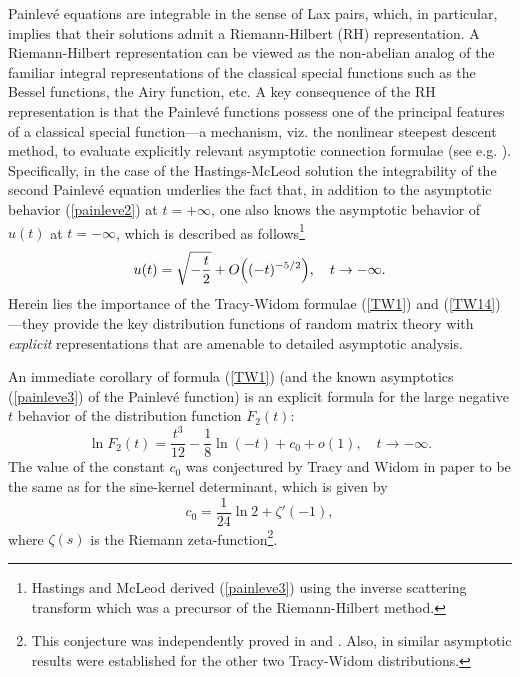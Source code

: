 \documentclass[11pt,letterpaper,reqno]{amsart}
\theoremstyle{definition}
\theoremstyle{remark}
\numberwithin{equation}{section}
\begin{document}
Painlev\'e equations are integrable in the sense of Lax pairs, which, in particular, implies that their
solutions admit  a  Riemann-Hilbert (RH) representation. A Riemann-Hilbert representation
can be viewed as the non-abelian analog of the familiar integral representations of
the classical special functions such as the Bessel functions, the
Airy function, etc.  A key consequence of the RH representation is  that
the Painlev\'e functions possess  one of the principal features of a  classical special
function---a mechanism, viz. the nonlinear steepest descent method, to evaluate  explicitly relevant asymptotic connection formulae
(see e.g. \cite{FIKN}).
Specifically, in the case of the Hastings-McLeod solution  the integrability
of the second   Painlev\'e equation underlies  the fact that, in addition to
the asymptotic behavior (\ref{painleve2}) at $t = +\infty$, one also knows
the asymptotic behavior of $u(t)$ at $t = -\infty$, which is described \cite{hast_mcleod} as follows{\footnote{
Hastings and McLeod  derived (\ref{painleve3}) using the inverse scattering transform which was a precursor  of the Riemann-Hilbert method.}}
\begin{equation}\label{painleve3}
u(t) = \sqrt{-\frac{t}{2}} + O\Bigl((-t)^{-5/2}\Bigr), \quad t \to -\infty.
\end{equation}
Herein lies  the importance of the Tracy-Widom formulae (\ref{TW1}) and (\ref{TW14})---they provide the key distribution functions of random matrix theory with {\it explicit} representations
that are amenable to detailed asymptotic analysis.

An immediate corollary of formula (\ref{TW1}) (and the known asymptotics (\ref{painleve3})
of the Painlev\'e function) is an explicit formula for the large negative
$t$ behavior of the distribution function $F_{2}(t)$:
\begin{equation}\label{asympairy1}
\ln F_2(t) = \frac{t^3}{12} - \frac{1}{8}\ln(- t )+ c_0 + o(1), \quad t \to -\infty.
\end{equation}
The value of the constant $c_0$ was conjectured by Tracy and Widom  in paper \cite{75}  to
be  the same as for the sine-kernel determinant, which is given by
\begin{equation}\label{Airyc0}
c_0 = \frac{1}{24}\ln 2 + \zeta'(-1),
\end{equation}
where $\zeta(s)$ is the Riemann zeta-function{\footnote{This conjecture was independently
proved in \cite{DIK} and \cite{Baik:2007}. Also, in \cite{Baik:2007} similar asymptotic results
were established for the other two Tracy-Widom distributions.}}.
\end{document}
